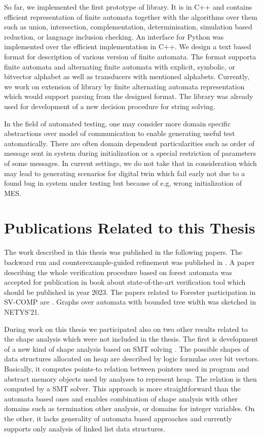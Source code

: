 {So far, we implemented the first prototype of library.
It is in C++ and contains efficient representation of finite automata
together with the algorithms over them such as union, intersection,
complementation, determinisation, simulation based reduction, or language inclusion checking.
An interface for Python was implemented over the efficient implementation in C++.
We design a text based format for description of various version of finite automata.
The format supporta finite automata and alternating finite automata with explicit, symbolic,
or bitvector alphabet as well as transducers with mentioned alphabets.
Currently, we work on extension of library by finite alternating automata representation
which would support parsing from the designed format.
The library was already used for development of a new decision procedure for string solving.


In the field of automated testing, one may consider more domain specific abstractions
over model of communication to enable generating useful test automatically.
There are often domain dependent particularities such as order of message sent
in system during initialization or a special restriction of parameters of some
messages.
In current settings, we do not take that in consideration which may lead to
generating scenarios for digital twin which fail early not due to a found bug
in system under testing but because of e.g, wrong initialization of MES.\

\section{Publications Related to this Thesis}
The work described in this thesis was published in the following papers.
The backward run and counterexample-guided refinement was published in \cite{vmcai17}.
A paper describing the whole verification procedure based on forest automata
was accepted for publication in book about state-of-the-art verification tool which
should be published in year 2023.
The papers related to Forester participation in SV-COMP are \cite{svcomp15-forester,holik_run_2016,holik_forester_2017}.
Graphs over automata with bounded tree width was sketched in NETYS'21.

During work on this thesis we participated also on two other results related to the shape
analysis which were not included in the thesis.
The first is development of a new kind of shape analysis based on SMT solving \cite{fmcad18, svcomp-2ls}.
The possible shapes of data structures allocated on heap are described by logic formulae over bit
vectors.
Basically, it computes points-to relation between pointers used in program and abstract memory
objects used by analyses to represent heap.
The relation is then computed by a SMT solver.
This approach is more straightforward than the automata based ones and enables combination of
shape analysis with other domains such as termination other analysis, or domains for integer variables.
On the other, it lacks generality of automata based approaches and currently supports
only analysis of linked list data structures.

}
